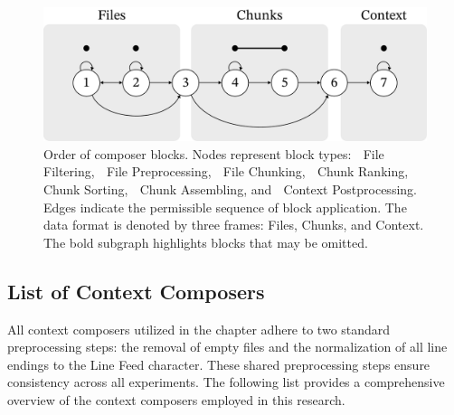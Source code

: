 \begin{figure}[ht]
    \centering
    \includegraphics[width=\textwidth]{figures/composer-blocks.pdf}
    \caption{Order of composer blocks. Nodes represent block types: \textcircled{} File Filtering, \textcircled{} File Preprocessing, \textcircled{} File Chunking, \textcircled{} Chunk Ranking, \textcircled{} Chunk Sorting, \textcircled{} Chunk Assembling, and \textcircled{} Context Postprocessing. Edges indicate the permissible sequence of block application. The data format is denoted by three frames: Files, Chunks, and Context. The bold subgraph highlights blocks that may be omitted.}\label{fig:composer-blocks}
\end{figure}

\subsection{List of Context Composers}\label{sec:context-composers-list}

\begin{sloppypar}
All context composers utilized in the  chapter adhere to two standard preprocessing steps: the removal of empty files and the normalization of all line endings to the Line Feed character. These shared preprocessing steps ensure consistency across all experiments. The following list provides a comprehensive overview of the context composers employed in this research.
\end{sloppypar}

